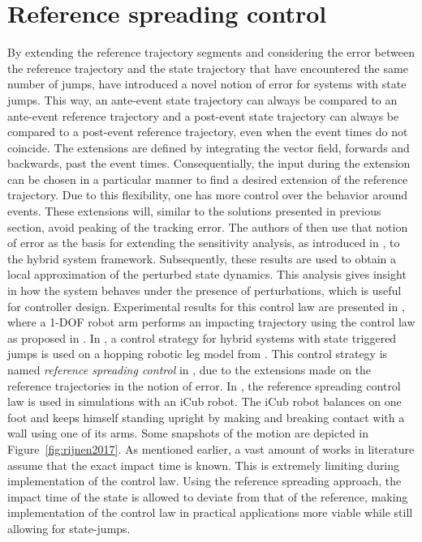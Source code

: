 \documentclass[../DC2017114Bouma.tex]{subfiles}
\begin{document}
\section{Reference spreading control}
By extending the reference trajectory segments and considering the error between the reference trajectory and the state trajectory that have encountered the same number of jumps, \cite{Saccon2014,Rijnen2015} have introduced a novel notion of error for systems with state jumps. This way, an ante-event state trajectory can always be compared to an ante-event reference trajectory and a post-event state trajectory can always be compared to a post-event reference trajectory, even when the event times do not coincide. The extensions are defined by integrating the vector field, forwards and backwards, past the event times. Consequentially, the input during the extension can be chosen in a particular manner to find a desired extension of the reference trajectory. Due to this flexibility, one has more control over the behavior around events. These extensions will, similar to the solutions presented in previous section, avoid peaking of the tracking error. The authors of \cite{Saccon2014,Rijnen2015} then use that notion of error as the basis for extending the sensitivity analysis, as introduced in \cite{Khalil1996}, to the hybrid system framework. Subsequently, these results are used to obtain a local approximation of the perturbed state dynamics. This analysis gives insight in how the system behaves under the presence of perturbations, which is useful for controller design. Experimental results for this control law are presented in \cite{Incremona2015}, where a 1-DOF robot arm performs an impacting trajectory using the control law as proposed in \cite{Saccon2014}. In \cite{Rijnen2016}, a control strategy for hybrid systems with state triggered jumps is used on a hopping robotic leg model from \cite{Tsagarakis2013}. This control strategy is named \textit{reference spreading control} in \cite{Rijnen2017}, due to the extensions made on the reference trajectories in the notion of error. In \cite{Rijnen2017a}, the reference spreading control law is used in simulations with an iCub robot. The iCub robot balances on one foot and keeps himself standing upright by making and breaking contact with a wall using one of its arms. Some snapshots of the motion are depicted in Figure~\ref{fig:rijnen2017}. As mentioned earlier, a vast amount of works in literature assume that the exact impact time is known. This is extremely limiting during implementation of the control law. Using the reference spreading approach, the impact time of the state is allowed to deviate from that of the reference, making implementation of the control law in practical applications more viable while still allowing for state-jumps.
\end{document}
